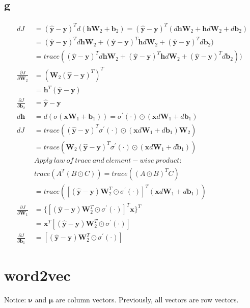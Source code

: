 \documentclass[11pt, oneside]{article}   	%
\begin{document}
\subsection{g}
\begin{align}
d J &= (\hat{\bm{y}} - \bm{y})^T d(\bm{h}\bm{W}_2+\bm{b}_2) = (\hat{\bm{y}} - \bm{y})^T (d\bm{h}\bm{W}_2+\bm{h}d\bm{W}_2+d\bm{b}_2)\\
&= (\hat{\bm{y}} - \bm{y})^T d\bm{h}\bm{W}_2+(\hat{\bm{y}} - \bm{y})^T \bm{h}d\bm{W}_2+(\hat{\bm{y}} - \bm{y})^T d\bm{b}_2)\\
&= trace((\hat{\bm{y}} - \bm{y})^T d\bm{h}\bm{W}_2+(\hat{\bm{y}} - \bm{y})^T \bm{h}d\bm{W}_2+(\hat{\bm{y}} - \bm{y})^T d\bm{b}_2))\\
\frac{\partial J}{\partial \bm{W}_2} &= (\bm{W}_2(\hat{\bm{y}} - \bm{y})^T)^T\\
&= \bm{h}^T(\hat{\bm{y}} - \bm{y})\\
\frac{\partial J}{\partial \bm{b}_2} &= \hat{\bm{y}} - \bm{y}\\
d \bm{h} &= d(\sigma(\bm{x}\bm{W}_1 + \bm{b}_1)) = {\sigma^\prime}(\bm{\cdot}) \odot (\bm{x}d\bm{W}_1 + d\bm{b}_1)\\
d J &= trace( (\hat{\bm{y}}-\bm{y})^T \sigma^\prime (\cdot) \odot(\bm{x}d\bm{W}_1 +d \bm{b}_1)\bm{W}_2)\\
&= trace(\bm{W}_2(\hat{\bm{y}}-\bm{y})^T \sigma^\prime (\cdot)\odot (\bm{x}d\bm{W}_1 +d \bm{b}_1))\\
& Apply~law~of~trace~and~element-wise~product:\\
& trace(A^T (B\odot C)) = trace((A \odot B)^T C) \\
&= trace([(\hat{\bm{y}}-\bm{y})\bm{W}_2^T \odot \sigma^\prime(\cdot)]^T (\bm{x}d\bm{W}_1 +d \bm{b}_1) )\\
\frac{\partial J}{\partial \bm{W}_1} &= \{[(\hat{\bm{y}}-\bm{y})\bm{W}_2^T \odot \sigma^\prime(\cdot)]^T \bm{x}\}^T\\
&= \bm{x}^T [(\hat{\bm{y}}-\bm{y})\bm{W}_2^T \odot \sigma^\prime(\cdot)]\\
\frac{\partial J}{\partial \bm{b}_1} &= [(\hat{\bm{y}}-\bm{y})\bm{W}_2^T \odot \sigma^\prime(\cdot)]
\end{align}

\section{word2vec}
Notice: $\bm\nu$ and $\bm\mu$ are column vectors. Previously, all vectors are row vectors. 
\end{document}
